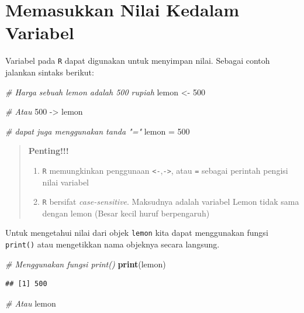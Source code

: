 \documentclass[]{book}
\newenvironment{Shaded}{\begin{snugshade}}{\end{snugshade}}
\newcommand{\CommentTok}[1]{\textcolor[rgb]{0.56,0.35,0.01}{\textit{#1}}}
\newcommand{\DecValTok}[1]{\textcolor[rgb]{0.00,0.00,0.81}{#1}}
\newcommand{\KeywordTok}[1]{\textcolor[rgb]{0.13,0.29,0.53}{\textbf{#1}}}
\newcommand{\NormalTok}[1]{#1}
\newcommand{\StringTok}[1]{\textcolor[rgb]{0.31,0.60,0.02}{#1}}
\providecommand{\tightlist}{%
  \setlength{\itemsep}{0pt}\setlength{\parskip}{0pt}}
\theoremstyle{definition}
\theoremstyle{definition}
\theoremstyle{definition}
\theoremstyle{remark}
\begin{document}
\hypertarget{assigningvar}{%
\section{Memasukkan Nilai Kedalam Variabel}\label{assigningvar}}

Variabel pada \texttt{R} dapat digunakan untuk menyimpan nilai. Sebagai contoh jalankan sintaks berikut:

\begin{Shaded}
\begin{Highlighting}[]
\CommentTok{# Harga sebuah lemon adalah 500 rupiah}
\NormalTok{lemon <-}\StringTok{ }\DecValTok{500}

\CommentTok{# Atau}
\DecValTok{500}\NormalTok{ ->}\StringTok{ }\NormalTok{lemon}

\CommentTok{# dapat juga menggunakan tanda "="}
\NormalTok{lemon =}\StringTok{ }\DecValTok{500}
\end{Highlighting}
\end{Shaded}

\begin{quote}
\textbf{Penting!!!}

\begin{enumerate}
\def\labelenumi{\arabic{enumi}.}
\tightlist
\item
  \texttt{R} memungkinkan penggunaan \texttt{\textless{}-},\texttt{-\textgreater{}}, atau \texttt{=} sebagai perintah pengisi nilai variabel
\item
  \texttt{R} bersifat \emph{case-sensitive}. Maksudnya adalah variabel Lemon tidak sama dengan lemon (Besar kecil huruf berpengaruh)
\end{enumerate}
\end{quote}

Untuk mengetahui nilai dari objek \texttt{lemon} kita dapat menggunakan fungsi \texttt{print()} atau mengetikkan nama objeknya secara langsung.

\begin{Shaded}
\begin{Highlighting}[]
\CommentTok{# Menggunakan fungsi print()}
\KeywordTok{print}\NormalTok{(lemon)}
\end{Highlighting}
\end{Shaded}

\begin{verbatim}
## [1] 500
\end{verbatim}

\begin{Shaded}
\begin{Highlighting}[]
\CommentTok{# Atau}
\NormalTok{lemon}
\end{Highlighting}
\end{Shaded}
\end{document}
